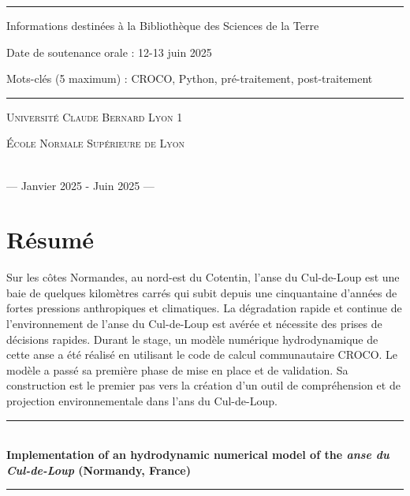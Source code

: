 \documentclass[10pt,a4paper,titlepage]{article}
\newcommand{\HRule}{\rule{\linewidth}{0.5mm}}
\begin{document}
\begin{titlepage}
\begin{sffamily}
\begin{center}
\HRule \vspace{0.2cm}
Informations destinées à la Bibliothèque des Sciences de la Terre

Date de soutenance orale : 12-13 juin 2025

Mots-clés (5 maximum) : CROCO, Python, pré-traitement, post-traitement
\HRule \vspace{0.2cm}
                \begin{minipage}{0.45\textwidth}
                    \begin{flushleft}
                        \textsc{Université Claude Bernard Lyon 1}
                    \end{flushleft}
                \end{minipage}
                \begin{minipage}{0.45\textwidth}
                    \begin{flushright}
                        \textsc{École Normale Supérieure de Lyon}
                    \end{flushright}
                \end{minipage}
                \\
                \vspace{0.4cm}
                {\large— Janvier 2025 - Juin 2025 —}

            \end{center}
        \end{sffamily}
    \end{titlepage}
\newpage

\section*{Résumé}
Sur les côtes Normandes, au nord-est du Cotentin, l'anse du Cul-de-Loup est une baie de quelques kilomètres carrés qui subit depuis une cinquantaine d'années de fortes pressions anthropiques et climatiques.
La dégradation rapide et continue de l'environnement de l'anse du Cul-de-Loup est avérée et nécessite des prises de décisions rapides.
Durant le stage, un modèle numérique hydrodynamique de cette anse a été réalisé en utilisant le code de calcul communautaire CROCO.
Le modèle a passé sa première phase de mise en place et de validation.
Sa construction est le premier pas vers la création d'un outil de compréhension et de projection environnementale dans l'ans du Cul-de-Loup.


\vspace{10cm}
\HRule \\[0.2cm]
{ \huge \bfseries Implementation of an hydrodynamic numerical model of the \textit{anse du Cul-de-Loup} (Normandy, France)\\ [0.2cm] }
\HRule \\[2cm]
\vspace{0.5cm}
\end{document}

